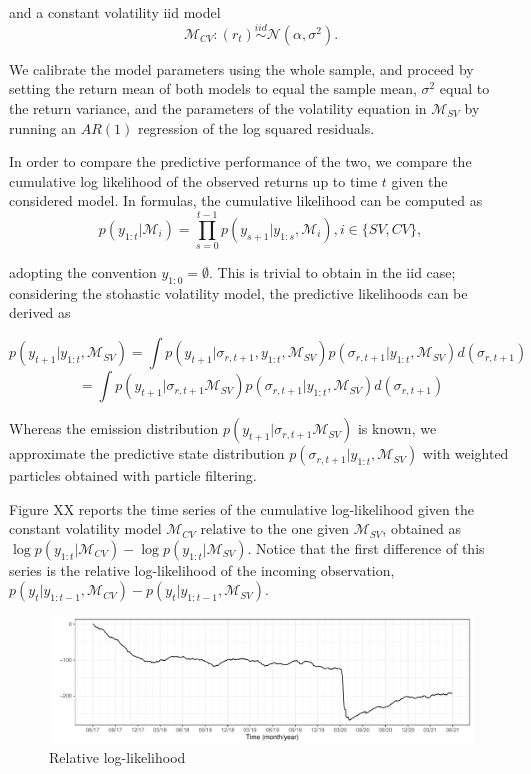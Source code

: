 \documentclass[
]{book}
\theoremstyle{break}
\theoremstyle{nonumberplain}
\begin{document}
and a constant volatility iid model \[
\mathcal{M}_{CV}:(r_{t})\overset{iid}{\sim}\mathcal{N}(\alpha,\sigma^{2}).
\]

We calibrate the model parameters using the whole sample, and proceed by
setting the return mean of both models to equal the sample mean,
\(\sigma^{2}\) equal to the return variance, and the parameters of the
volatility equation in \(\mathcal{M}_{SV}\) by running an \(AR(1)\)
regression of the log squared residuals.

In order to compare the predictive performance of the two, we compare
the cumulative log likelihood of the observed returns up to time \(t\)
given the considered model. In formulas, the cumulative likelihood can
be computed as \[
p(y_{1:t}|\mathcal{M}_{i})=\prod_{s=0}^{t-1}p(y_{s+1}|y_{1:s},\mathcal{M}_{i}),i\in\{SV,CV\},
\]

adopting the convention \(y_{1:0}=\emptyset\). This is trivial to obtain
in the iid case; considering the stohastic volatility model, the
predictive likelihoods can be derived as

\[
p(y_{t+1}|y_{1:t},\mathcal{M}_{SV})=\int p(y_{t+1}|\sigma_{r,t+1},y_{1:t},\mathcal{M}_{SV})p(\sigma_{r,t+1}|y_{1:t},\mathcal{M}_{SV})d(\sigma_{r,t+1})
\] \[
=\int p(y_{t+1}|\sigma_{r,t+1}\mathcal{M}_{SV})p(\sigma_{r,t+1}|y_{1:t},\mathcal{M}_{SV})d(\sigma_{r,t+1})
\]

Whereas the emission distribution
\(p(y_{t+1}|\sigma_{r,t+1}\mathcal{M}_{SV})\) is known, we approximate
the predictive state distribution
\(p(\sigma_{r,t+1}|y_{1:t},\mathcal{M}_{SV})\) with weighted particles
obtained with particle filtering.

Figure XX reports the time series of the cumulative log-likelihood given
the constant volatility model \(\mathcal{M}_{CV}\) relative to the one
given \(\mathcal{M}_{SV}\), obtained as
\(\log p(y_{1:t}|\mathcal{M}_{CV})-\log p(y_{1:t}|\mathcal{M}_{SV})\).
Notice that the first difference of this series is the relative
log-likelihood of the incoming observation,
\(p(y_{t}|y_{1:t-1},\mathcal{M}_{CV})-p(y_{t}|y_{1:t-1},\mathcal{M}_{SV})\).

\begin{figure}[H]

{\centering \includegraphics{final-draft_files/figure-latex/cll_plot-1} 

}

\caption{Relative log-likelihood}\label{fig:cll_plot}
\end{figure}
\end{document}
